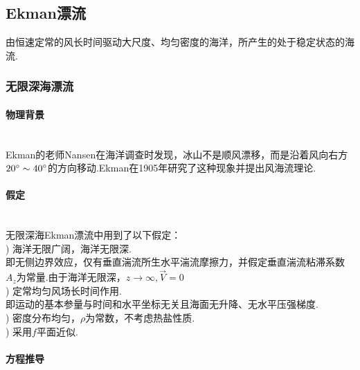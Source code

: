 \documentclass[a4paper,12pt]{article}
\begin{document}
    \subsection{Ekman漂流}
    由恒速定常的风长时间驱动大尺度、均匀密度的海洋，所产生的处于稳定状态的海流.
    \subsubsection{无限深海漂流}
    \paragraph{物理背景}~{} \\
	Ekman的老师Nansen在海洋调查时发现，冰山不是顺风漂移，而是沿着风向右方$20\degree\sim{40}\degree$的方向移动.Ekman在1905年研究了这种现象并提出风海流理论\cite{Ekman}.
	\paragraph{假定}~{} \\
	无限深海Ekman漂流中用到了以下假定：\\
	) 海洋无限广阔，海洋无限深.\\
	\indent
	即无侧边界效应，仅有垂直湍流所生水平湍流摩擦力，并假定垂直湍流粘滞系数$A_z$为常量.由于海洋无限深，$z\rightarrow\infty,\vec{V}=0$\\
	) 定常均匀风场长时间作用.\\
	\indent
	即运动的基本参量与时间和水平坐标无关且海面无升降、无水平压强梯度.\\
	) 密度分布均匀，$\rho$为常数，不考虑热盐性质.\\
	) 采用$f$平面近似.
	\paragraph{方程推导}~{}
\end{document}
